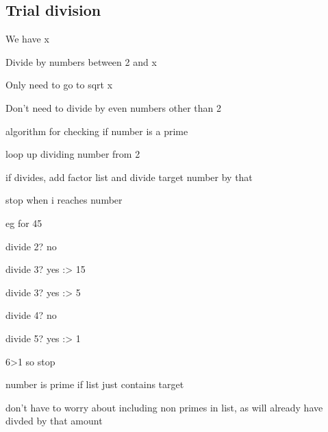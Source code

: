 
\subsection{Trial division}

We have x

Divide by numbers between 2 and x

Only need to go to sqrt x

Don't need to divide by even numbers other than 2


algorithm for checking if number is a prime

loop up dividing number from 2

if divides, add factor list and divide target number by that

stop when i reaches number

eg for 45

divide 2? no

divide 3? yes :> 15

divide 3? yes :> 5

divide 4? no

divide 5? yes :> 1

6>1 so stop

number is prime if list just contains target

don't have to worry about including non primes in list, as will already have divded by that amount
